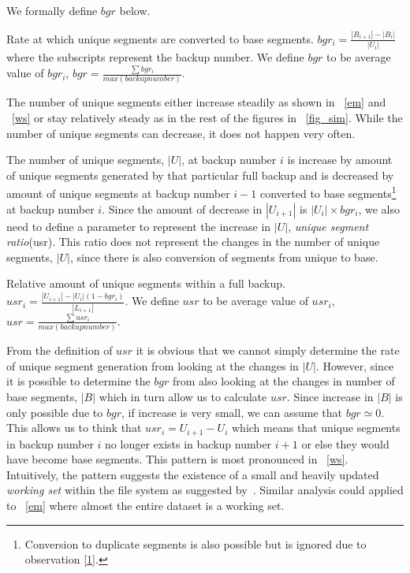 We formally define $bgr$ below.

\begin{definition}[$bgr$]
Rate at which unique segments are converted to base segments. $bgr_i=\frac{|B_{i+1}|-|B_i|}{|U_i|}$ where the subscripts represent the backup number. We define $bgr$ to be average value of $bgr_i$, $bgr = \frac{\sum bgr_i}{max(backup number)}$.
\end{definition}

\begin{observation}\label{3}
The number of unique segments either increase steadily as shown in \figurename~\ref{em} and \figurename~\ref{ws} or stay relatively steady as in the rest of the figures in \figurename~\ref{fig_sim}. While the number of unique segments can decrease, it does not happen very often.
\end{observation}

The number of unique segments, $|U|$, at backup number $i$ is increase by amount of unique segments generated by that particular full backup and is decreased by amount of unique segments at backup number $i-1$ converted to base segments\footnote{Conversion to duplicate segments is also possible but is ignored due to observation \ref{1}.} at backup number $i$. Since the amount of decrease in $|U_{i+1}|$ is $|U_i|\times bgr_i$, we also need to define a parameter to represent the increase in $|U|$, \emph{unique segment ratio}(usr). This ratio does not represent the changes in the number of unique segments, $|U|$, since there is also conversion of segments from unique to base.

\begin{definition}
Relative amount of unique segments within a full backup. $usr_i = \frac{|U_{i+1}|-|U_i|(1-bgr_i)}{|L_{i+1}|}$. We define $\mathit{usr}$ to be average value of $usr_i$, $usr = \frac{\sum usr_i}{max(backup number)}$.
\end{definition}

From the definition of $\mathit{usr}$ it is obvious that we cannot simply determine the rate of unique segment generation from looking at the changes in $|U|$. However, since it is possible to determine the $bgr$ from also looking at the changes in number of base segments, $|B|$ which in turn allow us to calculate $\mathit{usr}$. Since increase in $|B|$ is only possible due to $bgr$, if increase is very small, we can assume that $bgr\simeq0$. This allows us to think that $usr_i=U_{i+1}-U_i$ which means that unique segments in backup number $i$ no longer exists in backup number $i+1$ or else they would have become base segments. This pattern is most pronounced in \figurename~\ref{ws}. Intuitively, the pattern suggests the existence of a small and heavily updated \emph{working set} within the file system as suggested by~\cite{soundararajan:2010}. Similar analysis could applied to \figurename~\ref{em} where almost the entire dataset is a working set. 

